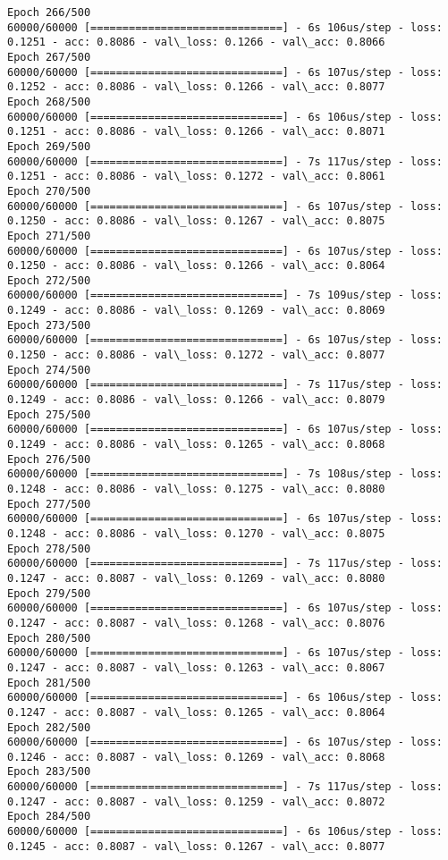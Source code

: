 \documentclass[11pt]{article}
\begin{document}
\begin{Verbatim}[commandchars=\\\{\}]
Epoch 266/500
60000/60000 [==============================] - 6s 106us/step - loss: 0.1251 - acc: 0.8086 - val\_loss: 0.1266 - val\_acc: 0.8066
Epoch 267/500
60000/60000 [==============================] - 6s 107us/step - loss: 0.1252 - acc: 0.8086 - val\_loss: 0.1266 - val\_acc: 0.8077
Epoch 268/500
60000/60000 [==============================] - 6s 106us/step - loss: 0.1251 - acc: 0.8086 - val\_loss: 0.1266 - val\_acc: 0.8071
Epoch 269/500
60000/60000 [==============================] - 7s 117us/step - loss: 0.1251 - acc: 0.8086 - val\_loss: 0.1272 - val\_acc: 0.8061
Epoch 270/500
60000/60000 [==============================] - 6s 107us/step - loss: 0.1250 - acc: 0.8086 - val\_loss: 0.1267 - val\_acc: 0.8075
Epoch 271/500
60000/60000 [==============================] - 6s 107us/step - loss: 0.1250 - acc: 0.8086 - val\_loss: 0.1266 - val\_acc: 0.8064
Epoch 272/500
60000/60000 [==============================] - 7s 109us/step - loss: 0.1249 - acc: 0.8086 - val\_loss: 0.1269 - val\_acc: 0.8069
Epoch 273/500
60000/60000 [==============================] - 6s 107us/step - loss: 0.1250 - acc: 0.8086 - val\_loss: 0.1272 - val\_acc: 0.8077
Epoch 274/500
60000/60000 [==============================] - 7s 117us/step - loss: 0.1249 - acc: 0.8086 - val\_loss: 0.1266 - val\_acc: 0.8079
Epoch 275/500
60000/60000 [==============================] - 6s 107us/step - loss: 0.1249 - acc: 0.8086 - val\_loss: 0.1265 - val\_acc: 0.8068
Epoch 276/500
60000/60000 [==============================] - 7s 108us/step - loss: 0.1248 - acc: 0.8086 - val\_loss: 0.1275 - val\_acc: 0.8080
Epoch 277/500
60000/60000 [==============================] - 6s 107us/step - loss: 0.1248 - acc: 0.8086 - val\_loss: 0.1270 - val\_acc: 0.8075
Epoch 278/500
60000/60000 [==============================] - 7s 117us/step - loss: 0.1247 - acc: 0.8087 - val\_loss: 0.1269 - val\_acc: 0.8080
Epoch 279/500
60000/60000 [==============================] - 6s 107us/step - loss: 0.1247 - acc: 0.8087 - val\_loss: 0.1268 - val\_acc: 0.8076
Epoch 280/500
60000/60000 [==============================] - 6s 107us/step - loss: 0.1247 - acc: 0.8087 - val\_loss: 0.1263 - val\_acc: 0.8067
Epoch 281/500
60000/60000 [==============================] - 6s 106us/step - loss: 0.1247 - acc: 0.8087 - val\_loss: 0.1265 - val\_acc: 0.8064
Epoch 282/500
60000/60000 [==============================] - 6s 107us/step - loss: 0.1246 - acc: 0.8087 - val\_loss: 0.1269 - val\_acc: 0.8068
Epoch 283/500
60000/60000 [==============================] - 7s 117us/step - loss: 0.1247 - acc: 0.8087 - val\_loss: 0.1259 - val\_acc: 0.8072
Epoch 284/500
60000/60000 [==============================] - 6s 106us/step - loss: 0.1245 - acc: 0.8087 - val\_loss: 0.1267 - val\_acc: 0.8077

\end{Verbatim}
\end{document}
